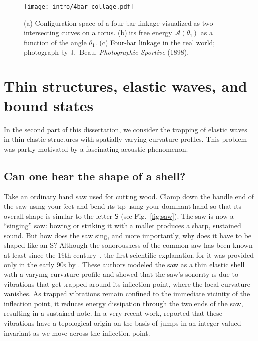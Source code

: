 \begin{figure}
  \begin{center}
    \texttt{[image: intro/4bar\_collage.pdf]}
  \end{center}
\caption{(a) Configuration space of a four-bar linkage visualized as two intersecting curves on a torus. (b) its free energy $\mathscr{A}(\theta_{1})$ as a function of the angle $\theta_{1}$. (c) Four-bar linkage in the real world; photograph by J.~Beau, \emph{Photographie Sportive} (1898).}
  \label{fig:4bar_collage}
\end{figure}

\section{Thin structures, elastic waves, and bound states}

In the second part of this dissertation, we consider the trapping of elastic waves in thin elastic structures with spatially varying curvature profiles. 
This problem was partly motivated by a fascinating acoustic phenomenon.

\subsection{Can one hear the shape of a shell?}

Take an ordinary hand saw used for cutting wood.
Clamp down the handle end of the saw using your feet and bend its tip using your dominant hand so that its overall shape is similar to the letter $\mathsf{S}$ (see Fig.~\ref{fig:saw}).
The saw is now a ``singing'' saw: bowing or striking it with a mallet produces a sharp, sustained sound.
But how does the saw sing, and more importantly, why does it have to be shaped like an \textsf{S}?
Although the sonorousness of the common saw has been known at least since the 19th century~\cite{stuckenbruck2016}, the first scientific explanation for it was provided only in the early 90s by \citet{scott1992}.
These authors modeled the saw as a thin elastic shell with a varying curvature profile and showed that the saw's sonority is due to vibrations that get trapped around its inflection point, where the local curvature vanishes.
As trapped vibrations remain confined to the immediate vicinity of the inflection point, it reduces energy dissipation through the two ends of the saw, resulting in a sustained note.
In a very recent work, \citet{shankar2022} reported that these vibrations have a topological origin on the basis of jumps in an integer-valued invariant as we move across the inflection point.

